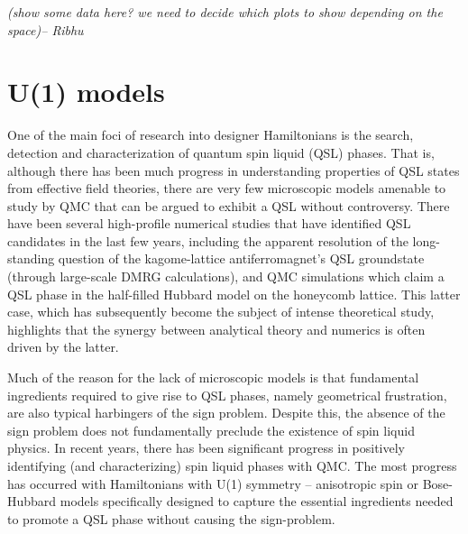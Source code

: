 \documentclass[aps,prb,groupedaddress,twocolumn]{revtex4}
\begin{document}
{\em (show some data here? we need to decide which plots to show
  depending on the space)-- Ribhu}
\section{U(1) models}

One of the main foci of research into designer Hamiltonians is the search, detection and characterization of quantum spin liquid (QSL) phases.  
That is, although there has been much progress in understanding properties of QSL states from effective field theories, there are very few microscopic models amenable to study by QMC that can be argued to exhibit a QSL without controversy.
There have been several high-profile numerical studies that have identified QSL candidates in the last few years, including the apparent resolution of the long-standing question of the kagome-lattice antiferromagnet's QSL groundstate (through large-scale DMRG calculations), and QMC simulations which claim a QSL phase in the half-filled Hubbard model on the honeycomb lattice.  This latter case, which has subsequently become the subject of intense theoretical study, highlights that the synergy between analytical theory and numerics is often driven by the latter.

Much of the reason for the lack of microscopic models is that fundamental ingredients required to give rise to QSL phases, namely geometrical frustration, are also typical harbingers of the sign problem.  Despite this,  the absence of the sign problem does not fundamentally preclude the existence of spin liquid physics.  In recent years, there has been significant progress in positively identifying (and characterizing) spin liquid phases with QMC.  The most progress has occurred with Hamiltonians with U(1) symmetry -- anisotropic spin or Bose-Hubbard models specifically designed to capture the essential ingredients needed to promote a QSL phase without causing the sign-problem.

\end{document}
